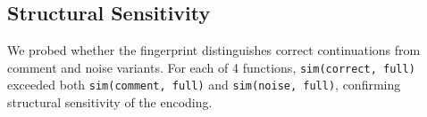 \subsection{Structural Sensitivity}
We probed whether the fingerprint distinguishes correct continuations from comment and noise variants.
For each of 4 functions, \texttt{sim(correct, full)} exceeded both \texttt{sim(comment, full)}
and \texttt{sim(noise, full)}, confirming structural sensitivity of the encoding.
